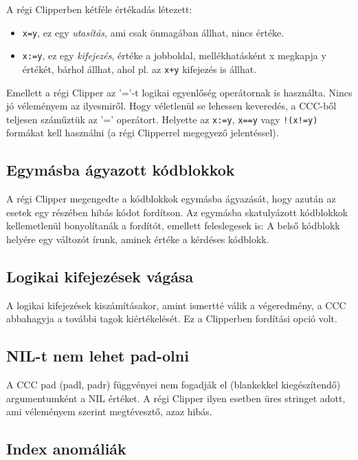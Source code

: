 A régi Clipperben kétféle értékadás létezett:
\begin{itemize}
\item \verb!x=y!, 
    ez egy {\em utasítás}, ami csak önmagában állhat, nincs értéke.
\item \verb!x:=y!, 
    ez egy {\em kifejezés}, értéke a jobboldal, mellékhatásként x megkapja
    y értékét, bárhol állhat, ahol pl. az \verb!x+y! kifejezés is állhat.
\end{itemize}
Emellett a régi Clipper az '='-t logikai egyenlőség operátornak is használta.
Nincs jó véleményem az ilyesmiről.
Hogy véletlenül se lehessen keveredés, a CCC-ből teljesen száműztük 
az '=' operátort. Helyette az  \verb|x:=y|, \verb|x==y| vagy \verb|!(x!=y)| 
formákat kell használni (a régi Clipperrel megegyező jelentéssel).


\subsection{Egymásba ágyazott kódblokkok}

A régi Clipper megengedte a kódblokkok egymásba ágyazását,
hogy azután az esetek egy részében hibás kódot fordítson.
Az egymásba skatulyázott  kódblokkok kellemetlenül bonyolítanák
a fordítót, emellett feleslegesek is: A belső kódblokk helyére egy 
változót írunk, aminek értéke  a kérdéses kódblokk.


\subsection{Logikai kifejezések vágása}

A logikai kifejezések kiszámításakor, amint ismertté válik a végeredmény, 
a CCC abbahagyja a további tagok kiértékelését. Ez a Clipperben fordítási 
opció volt.


\subsection{NIL-t nem lehet pad-olni}

A CCC pad (padl, padr) függvényei nem fogadják el (blankekkel kiegészítendő) 
argumentumként a NIL értéket. A régi Clipper ilyen esetben üres stringet adott, 
ami véleményem szerint megtévesztő, azaz hibás.


\subsection{Index anomáliák}

